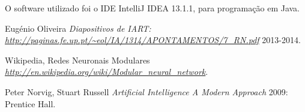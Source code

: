 \documentclass[10pt,a4paper]{article}
\begin{document}
O software utilizado foi o IDE IntelliJ IDEA 13.1.1, para programação em Java.


 \begin{thebibliography}{1}

   Eugénio Oliveira {\em Diapositivos de IART: {\url{http://paginas.fe.up.pt/~eol/IA/1314/APONTAMENTOS/7_RN.pdf}}}  2013-2014.
  
   Wikipedia, Redes Neuronais Modulares {\em\url{http://en.wikipedia.org/wiki/Modular_neural_network}}.

   Peter Norvig, Stuart Russell {\em Artificial Intelligence A Modern Approach } 2009: Prentice Hall.
  \end{thebibliography}
  \printindex
\end{document}
